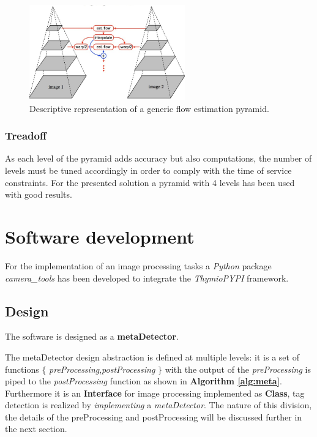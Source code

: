 \documentclass[a4paper]{report}
\begin{document}
\begin{figure}[H]
    \centering
    \includegraphics[width=0.6\textwidth]{lkp.jpg}
    \caption{Descriptive representation of a generic flow estimation pyramid.}
    \label{fig:lkp}
\end{figure}

\subsubsection{Treadoff}
As each level of the pyramid adds accuracy but also computations, the number of levels must be tuned accordingly in order to comply with the time of service constraints. For the presented solution a pyramid with 4 levels has been used with good results.

\section{Software development}

For the implementation of an image processing tasks a \textit{Python} package \textit{camera\_tools} has been developed to integrate the \textit{ThymioPYPI} framework.

\subsection{Design}

The software is designed as a \textbf{metaDetector}.

The metaDetector design abstraction is defined at multiple levels: it is a set of functions $\{$ \textit{preProcessing},\textit{postProcessing} $\}$ with the output of the \textit{preProcessing} is piped to the \textit{postProcessing} function as shown in \textbf{Algorithm \ref{alg:meta}}.
Furthermore it is an \textbf{Interface} for image processing implemented as \textbf{Class}, tag detection is realized by \textit{implementing} a \textit{metaDetector}. The nature of this division, the details of the preProcessing and postProcessing will be discussed further in the next section.\newline
\end{document}
